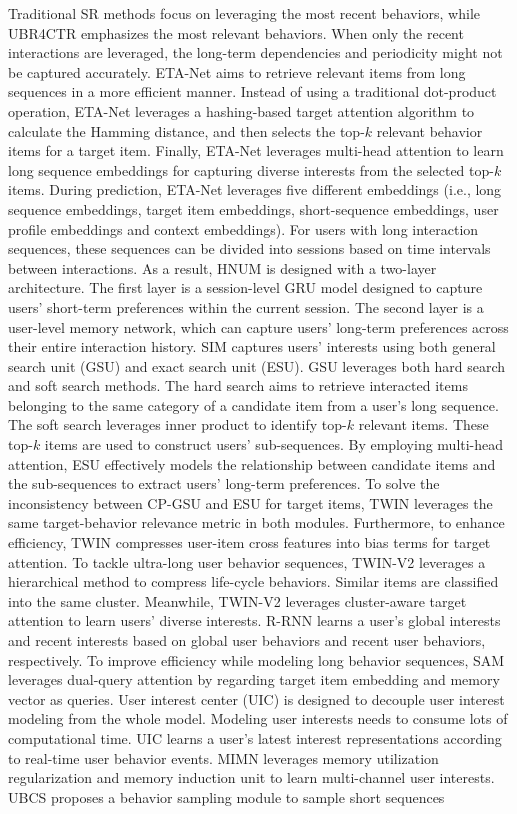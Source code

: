 \documentclass[review]{fcs}
\begin{document}
	Traditional SR methods focus on leveraging the most recent behaviors, while UBR4CTR \cite{UBR4CTR} emphasizes the most relevant behaviors. When only the recent interactions are leveraged, the long-term dependencies and periodicity might not be captured accurately. ETA-Net \cite{ETA-Net} aims to retrieve relevant items from long sequences in a more efficient manner. Instead of using a traditional dot-product operation, ETA-Net leverages a hashing-based target attention algorithm to calculate the Hamming distance, and then selects the top-$k$ relevant behavior items for a target item. Finally, ETA-Net leverages multi-head attention to learn long sequence embeddings for capturing diverse interests from the selected top-$k$ items. During prediction, ETA-Net leverages five different embeddings (i.e., long sequence embeddings, target item embeddings, short-sequence embeddings, user profile embeddings and context embeddings). For users with long interaction sequences, these sequences can be divided into sessions based on time intervals between interactions. As a result, HNUM \cite{HNUM} is designed with a two-layer architecture. The first layer is a session-level GRU model designed to capture users’ short-term preferences within the current session. The second layer is a user-level memory network, which can capture users’ long-term preferences across their entire interaction history. SIM \cite{SIM} captures users' interests using both general search unit (GSU) and exact search unit (ESU). GSU leverages both hard search and soft search methods. The hard search aims to retrieve interacted items belonging to the same category of a candidate item from a user’s long sequence. The soft search leverages inner product to identify top-$k$ relevant items. These top-$k$ items are used to construct users’ sub-sequences. By employing multi-head attention, ESU effectively models the relationship between candidate items and the sub-sequences to extract users' long-term preferences. To solve the inconsistency between CP-GSU and ESU for target items, TWIN \cite{TWIN} leverages the same target-behavior relevance metric in both modules. Furthermore, to enhance efficiency, TWIN compresses user-item cross features into bias terms for target attention. To tackle ultra-long user behavior sequences, TWIN-V2 \cite{TWIN-V2} leverages a hierarchical method to compress life-cycle behaviors. Similar items are classified into the same cluster. Meanwhile, TWIN-V2 leverages cluster-aware target attention to learn users’ diverse interests. R-RNN \cite{R-RNN} learns a user’s global interests and  recent interests based on global user behaviors and recent user behaviors, respectively. To improve efficiency while modeling long behavior sequences, SAM \cite{SAM} leverages dual-query attention by regarding target item embedding and memory vector as queries. User interest center (UIC) is designed to decouple user interest modeling from the whole model. Modeling user interests needs to consume lots of computational time. UIC learns a user’s latest interest representations according to real-time user behavior events. MIMN \cite{MIMN}  leverages memory utilization regularization and memory induction unit to learn multi-channel user interests. UBCS \cite{UBCS} proposes a behavior sampling module to sample short sequences 
\end{document}
